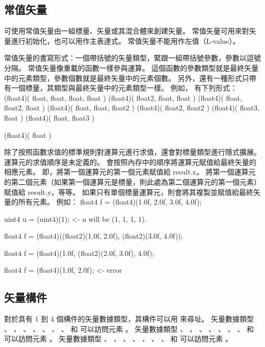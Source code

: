 \subsection{常值矢量}

可使用常值矢量由一組標量、矢量或其混合體來創建矢量。
常值矢量可用來對矢量進行初始化，也可以用作主表達式。
常值矢量不能用作左值（L-value）。

常值矢量的書寫形式：一個帶括號的矢量類型，緊跟一組帶括號參數，參數以逗號分隔。
常值矢量像重載的函數一樣參與運算。
這個函數的參數類型就是最終矢量中的元素類型，參數個數就是最終矢量中的元素個數。
另外，還有一種形式只帶有一個標量，其類型與最終矢量中的元素類型一樣。
例如，  有下列形式：
\startclc
(float4)( float, float, float, float )
(float4)( float2, float, float )
(float4)( float, float2, float )
(float4)( float, float, float2 )
(float4)( float2, float2 )
(float4)( float3, float )
(float4)( float, float3 )

(float4)( float )
\stopclc

除了按照函數求值的標準規則對運算元進行求值，還會對標量類型進行隱式擴展。
運算元的求值順序是未定義的。
會按照內存中的順序將運算元賦值給最終矢量的相應元素。
即，將第一個運算元的第一個元素賦值給 result.x，
將第一個運算元的第二個元素（如果第一個運算元是標量，則此處為第二個運算元的第一個元素）
賦值給 result.y，等等。
如果只有單個標量運算元，則會將其複製並賦值給最終矢量的所有元素。
例如：
\startclc
float4	f = (float4)(1.0f, 2.0f, 3.0f, 4.0f);

uint4	u = (uint4)(1);		<- u will be (1, 1, 1, 1).

float4	f = (float4)((float2)(1.0f, 2.0f),
		     (float2)(3.0f, 4.0f));

float4	f = (float4)(1.0f, (float2)(2.0f, 3.0f), 4.0f);

float4	f = (float4)(1.0f, 2.0f);	<- error
\stopclc

\subsection{矢量構件}

對於具有 1 到 4 個構件的矢量數據類型，其構件可以用  來尋址。
矢量數據類型 、 、 、 、
 、 、 、  和 
 可以訪問元素 。
矢量數據類型 、 、 、 、
 、 、 、  和 
 可以訪問元素 。
矢量數據類型 、 、 、 、
 、 、 、  和 
 可以訪問元素 。

